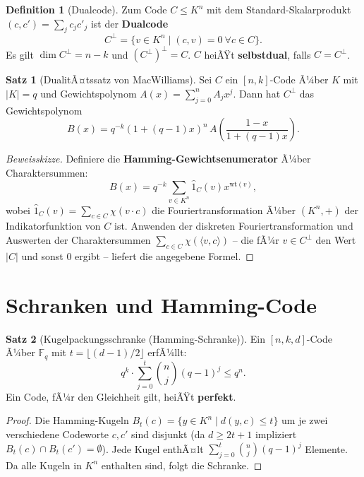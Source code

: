 ﻿\documentclass[a4paper,12pt]{report}
\theoremstyle{definition}
\newtheorem{definition}{Definition}
\newtheorem{satz}{Satz}
\begin{document}
\begin{definition}[Dualcode]
    Zum Code $C \leq K^n$ mit dem Standard-Skalarprodukt $(c, c') =
    \sum_j c_j c'_j$ ist der \textbf{Dualcode}
    \[
        C^\perp = \{v \in K^n \mid (c, v) = 0\ \forall c \in C\}.
    \]
    Es gilt $\dim C^\perp = n - k$ und $(C^\perp)^\perp = C$.
    $C$ heiÃŸt \textbf{selbstdual}, falls $C = C^\perp$.
\end{definition}

\begin{satz}[DualitÃ¤tssatz von MacWilliams]
    Sei $C$ ein $[n, k]$-Code Ã¼ber $K$ mit $|K| = q$ und
    Gewichtspolynom $A(x) = \sum_{j=0}^n A_j x^j$. Dann hat
    $C^\perp$ das Gewichtspolynom
    \[
        B(x) = q^{-k}(1 + (q-1)x)^n\, A\!\left(\frac{1-x}{1+(q-1)x}\right).
    \]
\end{satz}
\begin{proof}[Beweisskizze]
    Definiere die \textbf{Hamming-Gewichtsenumerator} Ã¼ber Charaktersummen:
    \[
        B(x) = q^{-k} \sum_{v \in K^n} \hat{1}_C(v) x^{\mathrm{wt}(v)},
    \]
    wobei $\hat{1}_C(v) = \sum_{c \in C} \chi(v \cdot c)$ die Fouriertransformation
    Ã¼ber $(K^n, +)$ der Indikatorfunktion von $C$ ist. Anwenden der diskreten
    Fouriertransformation und Auswerten der Charaktersummen
    $\sum_{c \in C} \chi(\langle v, c \rangle)$ -- die fÃ¼r $v \in C^\perp$
    den Wert $|C|$ und sonst $0$ ergibt -- liefert die angegebene Formel.
\end{proof}

\section{Schranken und Hamming-Code}

\begin{satz}[Kugelpackungsschranke (Hamming-Schranke)]
    Ein $[n, k, d]$-Code Ã¼ber $\mathbb{F}_q$ mit $t = \lfloor(d-1)/2\rfloor$
    erfÃ¼llt:
    \[
        q^k \cdot \sum_{j=0}^t \binom{n}{j}(q-1)^j \leq q^n.
    \]
    Ein Code, fÃ¼r den Gleichheit gilt, heiÃŸt \textbf{perfekt}.
\end{satz}
\begin{proof}
    Die Hamming-Kugeln $B_t(c) = \{y \in K^n \mid d(y,c) \leq t\}$
    um je zwei verschiedene Codeworte $c, c'$ sind disjunkt (da $d \geq 2t+1$
    impliziert $B_t(c) \cap B_t(c') = \emptyset$). Jede Kugel enthÃ¤lt
    $\sum_{j=0}^t \binom{n}{j}(q-1)^j$ Elemente.
    Da alle Kugeln in $K^n$ enthalten sind, folgt die Schranke.
\end{proof}
\end{document}
